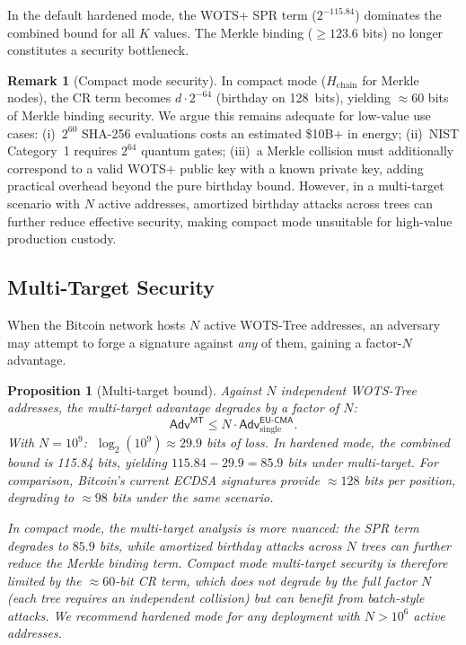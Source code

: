 \documentclass[11pt,a4paper]{article}
\newtheorem{proposition}[theorem]{Proposition}
\theoremstyle{definition}
\newtheorem{remark}[theorem]{Remark}
\begin{document}
In the default hardened mode, the WOTS+ SPR term ($2^{-115.84}$) dominates the combined bound for all $K$ values. The Merkle binding ($\geq 123.6$ bits) no longer constitutes a security bottleneck.

\begin{remark}[Compact mode security]
In compact mode ($H_{\mathrm{chain}}$ for Merkle nodes), the CR term becomes $d \cdot 2^{-64}$ (birthday on 128~bits), yielding $\approx 60$ bits of Merkle binding security. We argue this remains adequate for low-value use cases: (i)~$2^{60}$ SHA-256 evaluations costs an estimated \$10B+ in energy; (ii)~NIST Category~1 requires $2^{64}$ quantum gates; (iii)~a Merkle collision must additionally correspond to a valid WOTS+ public key with a known private key, adding practical overhead beyond the pure birthday bound. However, in a multi-target scenario with $N$ active addresses, amortized birthday attacks across trees can further reduce effective security, making compact mode unsuitable for high-value production custody.
\end{remark}

\subsection{Multi-Target Security}
\label{sec:multi-target}

When the Bitcoin network hosts $N$ active WOTS-Tree addresses, an adversary may attempt to forge a signature against \emph{any} of them, gaining a factor-$N$ advantage.

\begin{proposition}[Multi-target bound]
\label{prop:multi-target}
Against $N$ independent WOTS-Tree addresses, the multi-target advantage degrades by a factor of $N$:
$$
\mathsf{Adv}^{\mathsf{MT}} \leq N \cdot \mathsf{Adv}^{\mathsf{EU\text{-}CMA}}_{\mathrm{single}}.
$$
With $N = 10^9$: $\;\log_2(10^9) \approx 29.9$ bits of loss. In hardened mode, the combined bound is 115.84 bits, yielding $115.84 - 29.9 = 85.9$ bits under multi-target. For comparison, Bitcoin's current ECDSA signatures provide $\approx 128$ bits per position, degrading to $\approx 98$ bits under the same scenario.

In compact mode, the multi-target analysis is more nuanced: the SPR term degrades to $85.9$ bits, while amortized birthday attacks across $N$ trees can further reduce the Merkle binding term. Compact mode multi-target security is therefore limited by the $\approx 60$-bit CR term, which does not degrade by the full factor $N$ (each tree requires an independent collision) but can benefit from batch-style attacks. We recommend hardened mode for any deployment with $N > 10^6$ active addresses.
\end{proposition}
\end{document}
